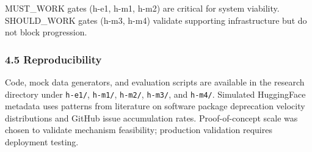 MUST\_WORK gates (h-e1, h-m1, h-m2) are critical for system viability. SHOULD\_WORK gates (h-m3, h-m4) validate supporting infrastructure but do not block progression.

\subsubsection{4.5 Reproducibility}

Code, mock data generators, and evaluation scripts are available in the research directory under \texttt{h-e1/}, \texttt{h-m1/}, \texttt{h-m2/}, \texttt{h-m3/}, and \texttt{h-m4/}. Simulated HuggingFace metadata uses patterns from literature on software package deprecation velocity distributions and GitHub issue accumulation rates. Proof-of-concept scale was chosen to validate mechanism feasibility; production validation requires deployment testing.
